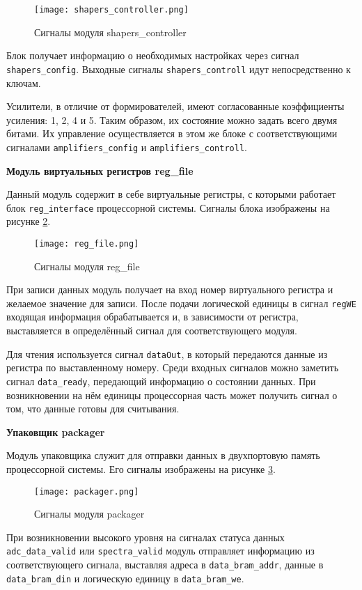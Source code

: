\begin{figure}[ht]
    \centering
    \texttt{[image: shapers\_controller.png]}
    \caption{Сигналы модуля shapers\_controller}
    \label{fig:shapers_controller}
\end{figure}
Блок получает информацию о необходимых настройках через сигнал \texttt{shapers\_config}. Выходные сигналы \texttt{shapers\_controll} идут непосредственно к ключам.\par
Усилители, в отличие от формирователей, имеют согласованные коэффициенты усиления: 1, 2, 4 и 5. Таким образом, их состояние можно задать всего двумя битами. Их управление осуществляется в этом же блоке с соответствующими сигналами \texttt{amplifiers\_config} и \texttt{amplifiers\_controll}.\par
\textbf{Модуль виртуальных регистров reg\_file}\par
Данный модуль содержит в себе виртуальные регистры, с которыми работает блок \texttt{reg\_interface} процессорной системы. Сигналы блока изображены на рисунке \ref{fig:reg_file}. \par
\begin{figure}[ht]
    \centering
    \texttt{[image: reg\_file.png]}
    \caption{Сигналы модуля reg\_file}
    \label{fig:reg_file}
\end{figure}
При записи данных модуль получает на вход номер виртуального регистра и желаемое значение для записи. После подачи логической единицы в сигнал \texttt{regWE} входящая информация обрабатывается и, в зависимости от регистра, выставляется в определённый сигнал для соответствующего модуля.\par
Для чтения используется сигнал \texttt{dataOut}, в который передаются данные из регистра по выставленному номеру. Среди входных сигналов можно заметить сигнал \texttt{data\_ready}, передающий информацию о состоянии данных. При возникновении на нём единицы процессорная часть может получить сигнал о том, что данные готовы для считывания.\par
\textbf{Упаковщик packager}\par
Модуль упаковщика служит для отправки данных в двухпортовую память процессорной системы. Его сигналы изображены на рисунке \ref{fig:packager}.\par 
\begin{figure}[ht]
    \centering
    \texttt{[image: packager.png]}
    \caption{Сигналы модуля packager}
    \label{fig:packager}
\end{figure}
При возникновении высокого уровня на сигналах статуса данных \texttt{adc\_data\_valid} или \texttt{spectra\_valid} модуль отправляет информацию из соответствующего сигнала, выставляя адреса в \texttt{data\_bram\_addr}, данные в \texttt{data\_bram\_din} и логическую единицу в \texttt{data\_bram\_we}.\par
